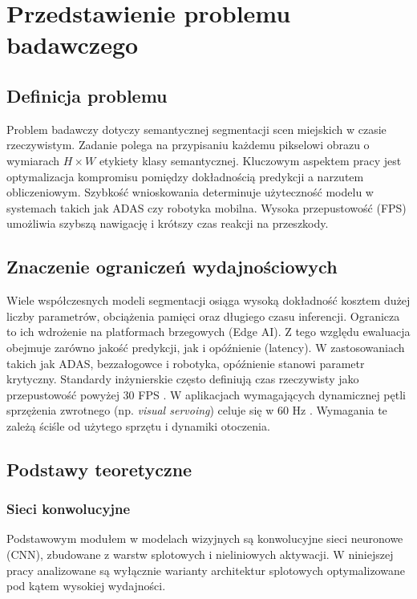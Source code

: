 \chapter{Przedstawienie problemu badawczego}

\section{Definicja problemu}
Problem badawczy dotyczy semantycznej segmentacji scen miejskich w czasie rzeczywistym. Zadanie polega na przypisaniu każdemu pikselowi obrazu o wymiarach $H \times W$ etykiety klasy semantycznej. Kluczowym aspektem pracy jest optymalizacja kompromisu pomiędzy dokładnością predykcji a narzutem obliczeniowym. Szybkość wnioskowania determinuje użyteczność modelu w systemach takich jak ADAS czy robotyka mobilna. Wysoka przepustowość (FPS) umożliwia szybszą nawigację i krótszy czas reakcji na przeszkody.

\section{Znaczenie ograniczeń wydajnościowych}
Wiele współczesnych modeli segmentacji osiąga wysoką dokładność kosztem dużej liczby parametrów, obciążenia pamięci oraz długiego czasu inferencji. Ogranicza to ich wdrożenie na platformach brzegowych (Edge AI). Z tego względu ewaluacja obejmuje zarówno jakość predykcji, jak i opóźnienie (latency). W zastosowaniach takich jak ADAS, bezzałogowce i robotyka, opóźnienie stanowi parametr krytyczny. Standardy inżynierskie często definiują czas rzeczywisty jako przepustowość powyżej 30 FPS . W aplikacjach wymagających dynamicznej pętli sprzężenia zwrotnego (np. \textit{visual servoing}) celuje się w 60 Hz . Wymagania te zależą ściśle od użytego sprzętu i dynamiki otoczenia.

\section{Podstawy teoretyczne}

\subsection{Sieci konwolucyjne}
Podstawowym modułem w modelach wizyjnych są konwolucyjne sieci neuronowe (CNN), zbudowane z warstw splotowych i nieliniowych aktywacji. W niniejszej pracy analizowane są wyłącznie warianty architektur splotowych optymalizowane pod kątem wysokiej wydajności.

